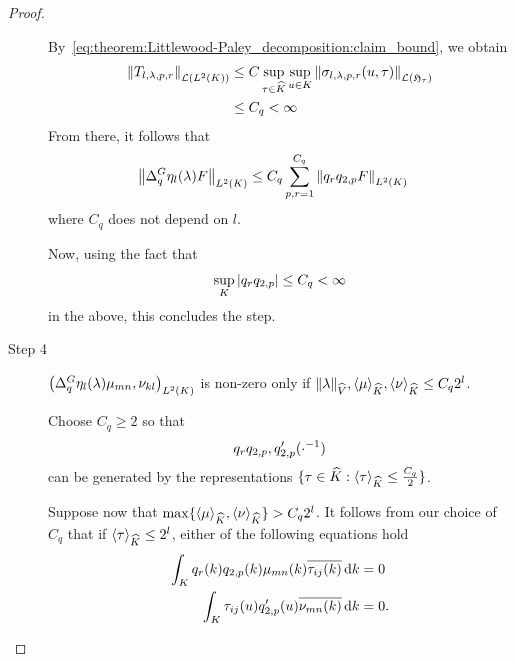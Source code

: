 \begin{proof}
\begin{description}
            By~\eqref{eq:theorem:Littlewood-Paley_decomposition:claim_bound},
            we obtain
            \begin{align*}
                \norm[\Lin{\Lebesgue{2}{\CompactGroup}}]{T_{l, \lambda, p, r}}
                &\leq C \sup_{\tau \in \dualGroup{\CompactGroup}} \sup_{u \in \CompactGroup} \norm[\Lin{\HilbertRep{\tau}}]{\sigma_{l, \lambda, p, r}(u, \tau)}\\
                &\leq C_q < \infty
            \end{align*}
            From there, it follows that
            \begin{align*}
                \norm[\Lebesgue{2}{\CompactGroup}]{\DifferenceOperator{q} \eta_l (\lambda) F}
                &\leq C_q \sum_{p, r = 1}^{C_q} \norm[\Lebesgue{2}{\CompactGroup}]{q_r q_{2, p} F}
            \end{align*}
            where $C_q$ does not depend on $l$.

            Now, using the fact that
            \begin{align*}
                \sup_\CompactGroup \abs{q_r q_{2, p}} \leq C_q < \infty
            \end{align*}
            in the above, this concludes the step.

        \item[Step 4] $\ip[\Lebesgue{2}{\CompactGroup}]{\DifferenceOperator{q} \eta_l(\lambda) \mu_{mn}}{\nu_{kl}}$ is non-zero
            only if $\norm[\dualGroup{\VectorSpace}]{\lambda}, \JapaneseBracket{\CompactGroup}{\mu}, \JapaneseBracket{\CompactGroup}{\nu} \leq C_q 2^l$.

            Choose $C_q \geq 2$ so that
            \begin{align*}
                q_r q_{2, p}, q'_{2, p}(\dummy^{-1})
            \end{align*}
            can be generated by the representations $\{ \tau \in \dualGroup{\CompactGroup} : \JapaneseBracket{\CompactGroup}{\tau} \leq \frac{C_q}{2} \}$.

            Suppose now that $\max\{\JapaneseBracket{\CompactGroup}{\mu}, \JapaneseBracket{\CompactGroup}{\nu}\} > C_q 2^l$.
            It follows from our choice of $C_q$ that if $\JapaneseBracket{\CompactGroup}{\tau} \leq 2^l$,
            either of the following equations hold
            \begin{align*}
                \int_\CompactGroup q_r(k) q_{2, p}(k) \mu_{mn}(k) \conj{\tau_{ij}(k)} \dd k &= 0\\
                \int_\CompactGroup \tau_{ij}(u) q'_{2, p}(u) \conj{\nu_{mn}(k)} \dd k &= 0.
            \end{align*}


\end{description}
\end{proof}
